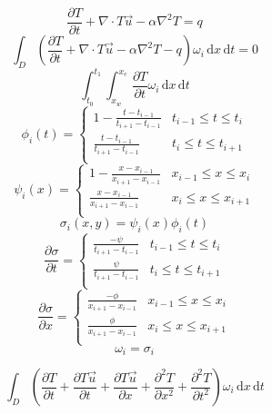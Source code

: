 \documentclass[12pt]{article}
\newcommand{\diff}[0]{\, \mathrm{d}}
\begin{document}
\[\frac{\partial T}{\partial t} + \nabla\cdot T \vec{u}-\alpha\nabla^2 T=q\]
\[\int_D (\frac{\partial T}{\partial t} + \nabla\cdot T \vec{u}-\alpha\nabla^2 T - q)\omega_i\diff x \diff t = 0\]
\vspace{3em}
\[\int_{t_0}^{t_1}\int_{x_w}^{x_e} \frac{\partial T}{\partial t} \omega_i\diff x \diff t\]
\[\phi_i(t) = 
\begin{cases}
1-\frac{t-t_{i-1}}{t_{i+1}-t_{i-1}} & t_{i-1} \leq t \leq t_i\\
\frac{t-t_{i-1}}{t_{i+1}-t_{i-1}} & t_i \leq t \leq t_{i+1}\\
\end{cases}\]
\[\psi_i(x) = 
\begin{cases}
1-\frac{x-x_{i-1}}{x_{i+1}-x_{i-1}} & x_{i-1} \leq x \leq x_i\\
\frac{x-x_{i-1}}{x_{i+1}-x_{i-1}} & x_i \leq x \leq x_{i+1}\\
\end{cases}\]
\[\sigma_i(x,y) = \psi_i(x)\phi_i(t)\]
\[\frac{\partial \sigma}{\partial t} = 
\begin{cases}
\frac{-\psi}{t_{i+1}-t_{i-1}} & t_{i-1} \leq t \leq t_i\\
\frac{\psi}{t_{i+1}-t_{i-1}} & t_i \leq t \leq t_{i+1}\\
\end{cases}\]
\[\frac{\partial \sigma}{\partial x} = 
\begin{cases}
\frac{-\phi}{x_{i+1}-x_{i-1}} & x_{i-1} \leq x \leq x_i\\
\frac{\phi}{x_{i+1}-x_{i-1}} & x_i \leq x \leq x_{i+1}\\
\end{cases}\]
\[\omega_i = \sigma_i\]

\[\int_D (\frac{\partial T}{\partial t} + \frac{\partial{T\vec{u}}}{\partial t}+\frac{\partial T\vec{u}}{\partial{x}}+\frac{\partial^2 T}{\partial x^2}+\frac{\partial^2 T}{\partial t^2})\omega_i \diff x \diff t\]
\end{document}
